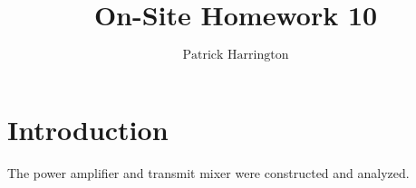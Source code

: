 \documentclass{./cls/hw}
\title{On-Site Homework 10}
\author{$\boxed{\text{Patrick Harrington}}$}
\begin{document}
\maketitle
\section*{Introduction}
The power amplifier and transmit mixer were constructed and analyzed.



\end{document}
